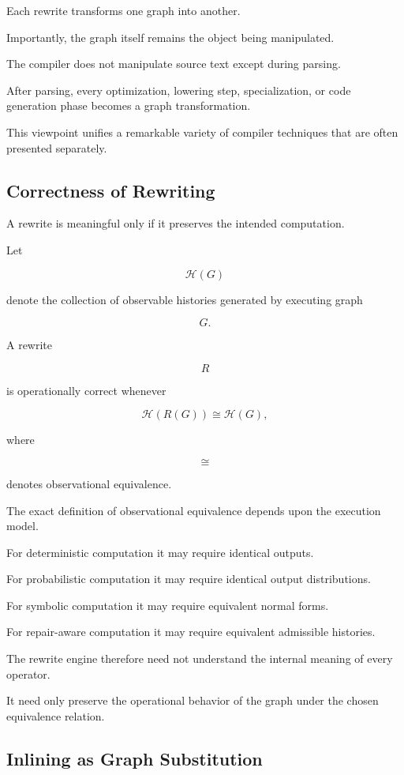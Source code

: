 \documentclass[12pt,oneside]{article}
\begin{document}
Each rewrite transforms one graph into another.

Importantly, the graph itself remains the object being manipulated.

The compiler does not manipulate source text except during parsing.

After parsing, every optimization, lowering step, specialization, or code generation phase becomes a graph transformation.

This viewpoint unifies a remarkable variety of compiler techniques that are often presented separately.

\subsection{Correctness of Rewriting}

A rewrite is meaningful only if it preserves the intended computation.

Let

\[
\mathcal H(G)
\]

denote the collection of observable histories generated by executing graph

\[
G.
\]

A rewrite

\[
R
\]

is operationally correct whenever

\[
\mathcal H(R(G))
\cong
\mathcal H(G),
\]

where

\[
\cong
\]

denotes observational equivalence.

The exact definition of observational equivalence depends upon the execution model.

For deterministic computation it may require identical outputs.

For probabilistic computation it may require identical output distributions.

For symbolic computation it may require equivalent normal forms.

For repair-aware computation it may require equivalent admissible histories.

The rewrite engine therefore need not understand the internal meaning of every operator.

It need only preserve the operational behavior of the graph under the chosen equivalence relation.

\subsection{Inlining as Graph Substitution}
\end{document}
